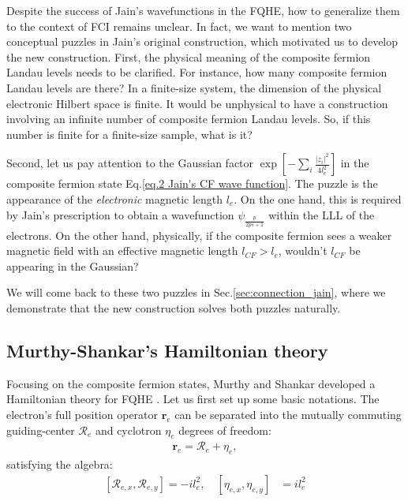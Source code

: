 Despite the success of Jain's wavefunctions in the FQHE, how to generalize them to the context of FCI remains unclear. In fact, we want to mention two conceptual puzzles in Jain's original construction, which motivated us to develop the new construction. First, the physical meaning of the composite fermion Landau levels needs to be clarified. For instance, how many composite fermion Landau levels are there? In a finite-size system, the dimension of the physical electronic Hilbert space is finite. It would be unphysical to have a construction involving an infinite number of composite fermion Landau levels. So, if this number is finite for a finite-size sample, what is it?

Second, let us pay attention to the Gaussian factor $\exp\left[-\sum_{i}\frac{|z_i|^2}{4l_e^2}\right]$ in the composite fermion state Eq.\eqref{eq.2 Jain's CF wave function}. The puzzle is the appearance of the \emph{electronic} magnetic length $l_e$. On the one hand, this is required by Jain's prescription to obtain a wavefunction $\psi_{\frac{p}{2ps+1}}$ within the LLL of the electrons. On the other hand, physically, if the composite fermion sees a weaker magnetic field with an effective magnetic length $l_{CF}>l_e$, wouldn't $l_{CF}$ be appearing in the Gaussian?

We will come back to these two puzzles in Sec.\ref{sec:connection_jain}, where we demonstrate that the new construction solves both puzzles naturally.

\subsection{Murthy-Shankar's Hamiltonian theory}
Focusing on the composite fermion states, Murthy and Shankar developed a Hamiltonian theory for FQHE \cite{murthy2003hamiltonian}. Let us first set up some basic notations. The electron's full position operator $\bm r_e$ can be separated into the mutually commuting guiding-center $\mathcal R_e$ and cyclotron $\eta_e$ degrees of freedom:
\begin{align}
    \bm r_e=\mathcal R_e+\eta_e,
\end{align}
satisfying the algebra:
\begin{align}\label{eq:e_guiding_center}
    [\mathcal R_{e,x},\mathcal R_{e,y}]=-il_e^2, \quad [\eta_{e,x},\eta_{e,y}] & =il_e^2
\end{align}

